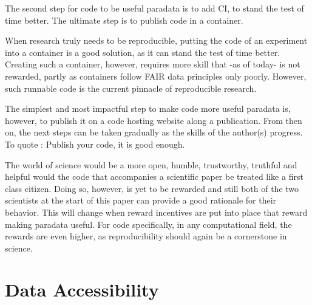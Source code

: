 The second step for code to be useful paradata is to add CI, 
to stand the test of time better.
The ultimate step is to publish code in a container.


When research truly needs to be reproducible, putting the code 
of an experiment into a container is a good solution, as it 
can stand the test of time better.
Creating such a container, however, requires more skill
that -as of today- is not rewarded,
partly as containers follow FAIR data principles only poorly.
However, such runnable code is the current pinnacle of reproducible research.


The simplest and most impactful step to make code more useful paradata
is, however, to publish it on a code hosting website 
along a publication. From then on, the next steps can be taken 
gradually as the skills of the author(s) progress.
To quote \cite{barnes2010publish}: Publish your code, it is good enough.


The world of science would be a more open, humble, trustworthy, truthful
and helpful would the code that accompanies a scientific paper
be treated like a first class citizen. 
Doing so, however, is yet to be rewarded
and still both of the two scientists at the start of this paper 
can provide a good rationale for their behavior.
This will change when reward incentives are put into place 
that reward making paradata useful.
For code specifically, in any computational field,
the rewards are even higher, as reproducibility should again be 
a cornerstone in science.

\section{Data Accessibility}

